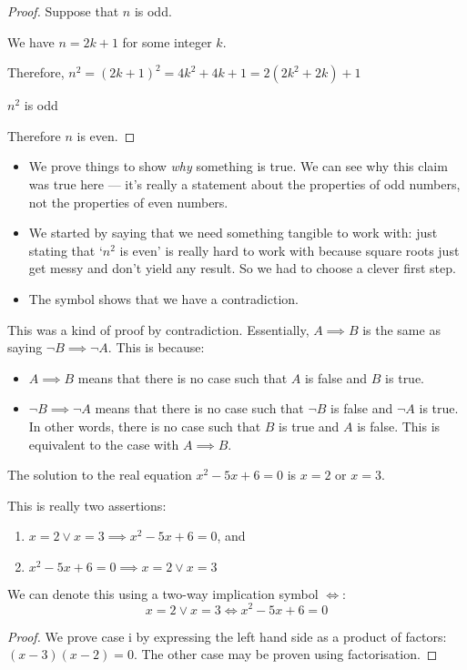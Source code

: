 \begin{proof}
	Suppose that \(n\) is odd.

	We have \(n = 2k+1\) for some integer \(k\).

	Therefore, \(n^2 = (2k+1)^2 = 4k^2 + 4k + 1 = 2(2k^2 + 2k) + 1\)

	\(n^2\) is odd \contradiction{}

	Therefore \(n\) is even.
\end{proof}
\begin{itemize}
	\item We prove things to show \textit{why} something is true.
	      We can see why this claim was true here --- it's really a statement about the properties of odd numbers, not the properties of even numbers.
	\item We started by saying that we need something tangible to work with: just stating that `\(n^2\) is even' is really hard to work with because square roots just get messy and don't yield any result.
	      So we had to choose a clever first step.
	\item The symbol \contradiction{} shows that we have a contradiction.
\end{itemize}

This was a kind of proof by contradiction.
Essentially, \(A \implies B\) is the same as saying \(\neg B \implies \neg A\).
This is because:
\begin{itemize}
	\item \(A \implies B\) means that there is no case such that \(A\) is false and \(B\) is true.
	\item \(\neg B \implies \neg A\) means that there is no case such that \(\neg B\) is false and \(\neg A\) is true.
	      In other words, there is no case such that \(B\) is true and \(A\) is false.
	      This is equivalent to the case with \(A \implies B\).
\end{itemize}

\begin{claim}
	The solution to the real equation \(x^2-5x+6=0\) is \(x=2\) or \(x=3\).
\end{claim}
\begin{note}
	This is really two assertions:
	\begin{enumerate}
		\item \(x=2 \lor x=3 \implies x^2 - 5x + 6 = 0\), and
		\item \(x^2 - 5x + 6 = 0 \implies x=2 \lor x=3\)
	\end{enumerate}
	We can denote this using a two-way implication symbol \(\iff\):
	\[
		x=2 \lor x=3 \iff x^2 - 5x + 6 = 0
	\]
\end{note}
\begin{proof}
	We prove case i by expressing the left hand side as a product of factors: \((x-3)(x-2)=0\).
	The other case may be proven using factorisation.
\end{proof}

